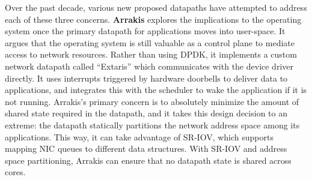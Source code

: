 Over the past decade, various new proposed datapaths have attempted to address each of these three concerns.
\textbf{Arrakis} explores the implications to the operating system once the primary datapath for applications moves into user-space. It argues that the operating system is still valuable as a control plane to mediate access to network resources. Rather than using DPDK, it implements a custom network datapath called ``Extaris'' which communicates with the device driver directly. 
It uses interrupts triggered by hardware doorbells to deliver data to applications, and integrates this with the scheduler to wake the application if it is not running.
Arrakis's primary concern is to absolutely minimize the amount of shared state required in the datapath, and it takes this design decision to an extreme: the datapath statically partitions the network address space among its applications. This way, it can take advantage of SR-IOV, which supports mapping NIC queues to different data structures. With SR-IOV and address space partitioning, Arrakis can ensure that no datapath state is shared across cores. 

